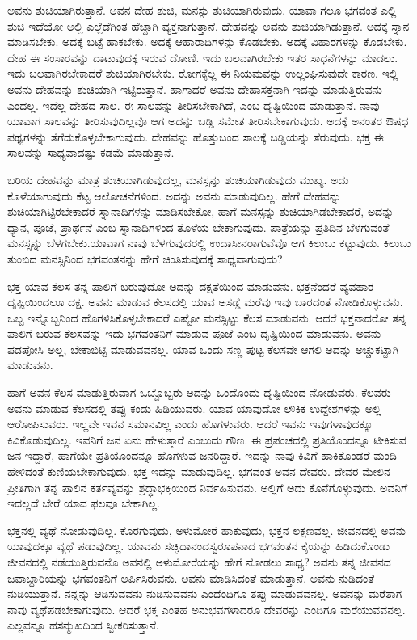 ಅವನು ಶುಚಿಯಾಗಿರುತ್ತಾನೆ. ಅವನ ದೇಹ ಶುಚಿ, ಮನಸ್ಸು ಶುಚಿಯಾಗಿರುವುದು. ಯಾವಾ ಗಲೂ ಭಗವಂತ ಎಲ್ಲಿ ಶುಚಿ ಇದೆಯೋ ಅಲ್ಲಿ ಎಲ್ಲೆಡೆಗಿಂತ ಹೆಚ್ಚಾಗಿ ವ್ಯಕ್ತನಾಗುತ್ತಾನೆ. ದೇಹವನ್ನು ಅವನು ಶುಚಿಯಾಗಿಡುತ್ತಾನೆ. ಅದಕ್ಕೆ ಸ್ನಾನ ಮಾಡಿಸಬೇಕು. ಅದಕ್ಕೆ ಬಟ್ಟೆ ಹಾಕಬೇಕು. ಅದಕ್ಕೆ ಆಹಾರಾದಿಗಳನ್ನು ಕೊಡಬೇಕು. ಅದಕ್ಕೆ ವಿಹಾರಗಳನ್ನು ಕೊಡಬೇಕು. ದೇಹ ಈ ಸಂಸಾರವನ್ನು ದಾಟುವುದಕ್ಕೆ ಇರುವ ದೋಣಿ. ಇದು ಬಲವಾಗಿರಬೇಕು ಇತರ ಸಾಧನೆಗಳನ್ನು ಮಾಡಲು. ಇದು ಬಲವಾಗಿರಬೇಕಾದರೆ ಶುಚಿಯಾಗಿರಬೇಕು. ರೋಗಕ್ಕೆಲ್ಲ ಈ ನಿಯಮವನ್ನು ಉಲ್ಲಂಘಿಸುವುದೇ ಕಾರಣ. ಇಲ್ಲಿ ಅವನು ದೇಹವನ್ನು ಶುಚಿಯಾಗಿ ಇಟ್ಟಿರುತ್ತಾನೆ. ಹಾಗಾದರೆ ಅವನು ದೇಹಾಸಕ್ತನಾಗಿ ಇದನ್ನು ಮಾಡುತ್ತಿರುವನು ಎಂದಲ್ಲ. ಇದೆಲ್ಲ ದೇಹದ ಸಾಲ. ಈ ಸಾಲವನ್ನು ತೀರಿಸಬೇಕಾಗಿದೆ, ಎಂಬ ದೃಷ್ಟಿಯಿಂದ ಮಾಡುತ್ತಾನೆ. ನಾವು ಯಾವಾಗ ಸಾಲವನ್ನು ತೀರಿಸುವುದಿಲ್ಲವೊ ಆಗ ಅದನ್ನು ಬಡ್ಡಿ ಸಮೇತ ತೀರಿಸಬೇಕಾಗುವುದು. ಅದಕ್ಕೆ ಅನಂತರ ಔಷಧ ಪಥ್ಯಗಳನ್ನು ತೆಗೆದುಕೊಳ್ಳಬೇಕಾಗುವುದು. ದೇಹವನ್ನು ಹೊತ್ತುಬಂದ ಸಾಲಕ್ಕೆ ಬಡ್ಡಿಯನ್ನು ತೆರುವುದು. ಭಕ್ತ ಈ ಸಾಲವನ್ನು ಸಾಧ್ಯವಾದಷ್ಟು ಕಡಮೆ ಮಾಡುತ್ತಾನೆ.

ಬರಿಯ ದೇಹವನ್ನು ಮಾತ್ರ ಶುಚಿಯಾಗಿಡುವುದಲ್ಲ, ಮನಸ್ಸನ್ನು ಶುಚಿಯಾಗಿಡುವುದು ಮುಖ್ಯ. ಅದು ಕೊಳೆಯಾಗುವುದು ಕೆಟ್ಟ ಆಲೋಚನೆಗಳಿಂದ. ಅದನ್ನು ಅವನು ಮಾಡುವುದಿಲ್ಲ. ಹೇಗೆ ದೇಹವನ್ನು ಶುಚಿಯಾಗಿಟ್ಟಿರಬೇಕಾದರೆ ಸ್ನಾನಾದಿಗಳನ್ನು ಮಾಡಿಸಬೇಕೋ, ಹಾಗೆ ಮನಸ್ಸನ್ನು ಶುಚಿಯಾಗಿಡಬೇಕಾದರೆ, ಅದನ್ನು ಧ್ಯಾನ, ಪೂಜೆ, ಪ್ರಾರ್ಥನೆ ಎಂಬ ಸ್ನಾನಾದಿಗಳಿಂದ ತೊಳೆಯ ಬೇಕಾಗುವುದು. ಪಾತ್ರೆಯನ್ನು ಪ್ರತಿದಿನ ಬೆಳಗುವಂತೆ ಮನಸ್ಸನ್ನು ಬೆಳಗಬೇಕು.\break ಯಾವಾಗ ನಾವು ಬೆಳಗುವುದರಲ್ಲಿ ಉದಾಸೀನರಾಗುವೆವೊ ಆಗ ಕಿಲುಬು ಕಟ್ಟುವುದು. ಕಿಲುಬು ತುಂಬಿದ ಮನಸ್ಸಿನಿಂದ ಭಗವಂತನನ್ನು ಹೇಗೆ ಚಿಂತಿಸುವುದಕ್ಕೆ ಸಾಧ್ಯವಾಗುವುದು?

ಭಕ್ತ ಯಾವ ಕೆಲಸ ತನ್ನ ಪಾಲಿಗೆ ಬರುವುದೋ ಅದನ್ನು ದಕ್ಷತೆಯಿಂದ ಮಾಡುವನು. ಭಕ್ತನೆಂದರೆ ವ್ಯವಹಾರ ದೃಷ್ಟಿಯಿಂದಲೂ ದಕ್ಷ. ಅವನು ಮಾಡುವ ಕೆಲಸದಲ್ಲಿ ಯಾವ ಅಸಡ್ಡೆ ಮರೆವು ಇವು ಬಾರದಂತೆ ನೋಡಿಕೊಳ್ಳುವನು. ಒಬ್ಬ ಇನ್ನೊಬ್ಬನಿಂದ ಹೊಗಳಿಸಿಕೊಳ್ಳಬೇಕಾದರೆ ಎಷ್ಟೋ ಮನಸ್ಸಿಟ್ಟು ಕೆಲಸ ಮಾಡುವನು. ಆದರೆ ಭಕ್ತನಾದರೋ ತನ್ನ ಪಾಲಿಗೆ ಬರುವ ಕೆಲಸವನ್ನು ಇದು ಭಗವಂತನಿಗೆ ಮಾಡುವ ಪೂಜೆ ಎಂಬ ದೃಷ್ಟಿಯಿಂದ ಮಾಡುವನು. ಅವನು ಪಡಪೋಸಿ ಅಲ್ಲ, ಬೇಕಾಬಿಟ್ಟಿ ಮಾಡುವವನಲ್ಲ. ಯಾವ ಒಂದು ಸಣ್ಣ ಪುಟ್ಟ ಕೆಲಸವೇ ಆಗಲಿ ಅದನ್ನು ಅಚ್ಚುಕಟ್ಟಾಗಿ ಮಾಡುವನು.

ಹಾಗೆ ಅವನ ಕೆಲಸ ಮಾಡುತ್ತಿರುವಾಗ ಒಬ್ಬೊಬ್ಬರು ಅದನ್ನು ಒಂದೊಂದು ದೃಷ್ಟಿಯಿಂದ ನೋಡುವರು. ಕೆಲವರು ಅವನು ಮಾಡುವ ಕೆಲಸದಲ್ಲಿ ತಪ್ಪು ಕಂಡು ಹಿಡಿಯುವರು. ಯಾವ ಯಾವುದೋ ಲೌಕಿಕ ಉದ್ದೇಶಗಳನ್ನು ಅಲ್ಲಿ ಆರೋಪಿಸುವರು. ಇಲ್ಲವೇ ಇವನ ಸಮಾನವಿಲ್ಲ ಎಂದು ಹೊಗಳುವರು. ಆದರೆ ಇವನು ಇವುಗಳಾವುದಕ್ಕೂ ಕಿವಿಕೊಡುವುದಿಲ್ಲ. ಇವನಿಗೆ ಜನ ಏನು ಹೇಳುತ್ತಾರೆ ಎಂಬುದು ಗೌಣ. ಈ ಪ್ರಪಂಚದಲ್ಲಿ ಪ್ರತಿಯೊಂದನ್ನೂ ಟೀಕಿಸುವ ಜನ ಇದ್ದಾರೆ, ಹಾಗೆಯೇ ಪ್ರತಿಯೊಂದನ್ನೂ ಹೊಗಳುವ ಜನರಿದ್ದಾರೆ. ಇದನ್ನು ನಾವು ಕಿವಿಗೆ ಹಾಕಿಕೊಂಡರೆ ಮಂದಿ ಹೇಳಿದಂತೆ ಕುಣಿಯಬೇಕಾಗುವುದು. ಭಕ್ತ ಇದನ್ನು ಮಾಡುವುದಿಲ್ಲ. ಭಗವಂತ ಅವನ ದೇವರು. ದೇವರ ಮೇಲಿನ ಪ್ರೀತಿಗಾಗಿ ತನ್ನ ಪಾಲಿನ ಕರ್ತವ್ಯವನ್ನು ಶ್ರದ್ಧಾಭಕ್ತಿಯಿಂದ ನಿರ್ವಹಿಸುವನು. ಅಲ್ಲಿಗೆ ಅದು ಕೊನೆಗೊಳ್ಳುವುದು. ಅವನಿಗೆ ಇದಲ್ಲದೆ ಬೇರೆ ಯಾವ ಫಲವೂ ಬೇಕಾಗಿಲ್ಲ. 

ಭಕ್ತನಲ್ಲಿ ವ್ಯಥೆ ನೋಡುವುದಿಲ್ಲ. ಕೊರಗುವುದು, ಅಳುಮೋರೆ ಹಾಕುವುದು, ಭಕ್ತನ ಲಕ್ಷಣವಲ್ಲ. ಜೀವನದಲ್ಲಿ ಅವನು ಯಾವುದಕ್ಕೂ ವ್ಯಥೆ ಪಡುವುದಿಲ್ಲ. ಯಾವನು ಸಚ್ಚಿದಾನಂದಸ್ವರೂಪನಾದ ಭಗವಂತನ ಕೈಯನ್ನು ಹಿಡಿದುಕೊಂಡು ಜೀವನದಲ್ಲಿ ನಡೆಯುತ್ತಿರುವನೊ ಅವನಲ್ಲಿ ಅಳು\-ಮೋರೆಯನ್ನು ಹೇಗೆ ನೋಡಲು ಸಾಧ್ಯ? ಅವನು ತನ್ನ ಜೀವನದ ಜವಾಬ್ದಾರಿಯನ್ನು ಭಗವಂತನಿಗೆ ಅರ್ಪಿಸಿರುವನು. ಅವನು ಮಾಡಿಸಿದಂತೆ ಮಾಡುತ್ತಾನೆ. ಅವನು ನುಡಿದಂತೆ ನುಡಿಯುತ್ತಾನೆ. ನನ್ನನ್ನು ಆಡಿಸುವವನು ನುಡಿಸುವವನು ಎಂದೆಂದಿಗೂ ತಪ್ಪು ಮಾಡುವವನಲ್ಲ. ಅವನನ್ನು ಮರೆತಾಗ ನಾವು ವ್ಯಥೆಪಡಬೇಕಾಗುವುದು. ಆದರೆ ಭಕ್ತ ಎಂತಹ ಅನುಭವಗಳಾದರೂ ದೇವರನ್ನು ಎಂದಿಗೂ ಮರೆಯುವವನಲ್ಲ. ಎಲ್ಲವನ್ನೂ ಹಸನ್ಮುಖದಿಂದ ಸ್ವೀಕರಿಸುತ್ತಾನೆ.

